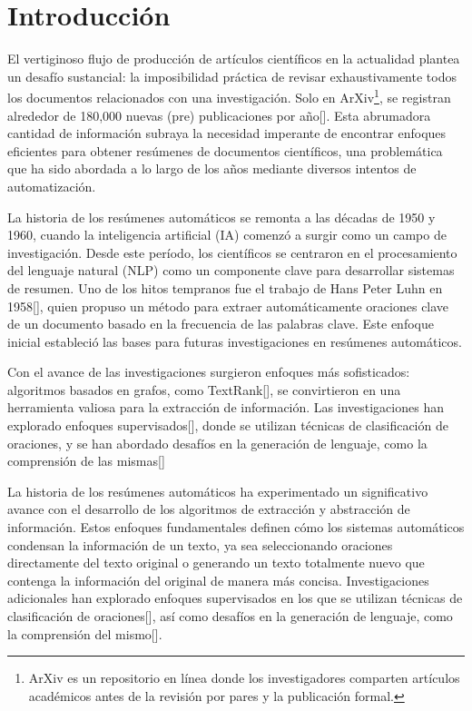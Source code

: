 \chapter*{Introducción}\label{chapter:introduction}

    El vertiginoso flujo de producción de artículos científicos en la actualidad plantea un desafío sustancial: la imposibilidad práctica de revisar exhaustivamente todos los documentos relacionados con una investigación. Solo en ArXiv\footnote{ArXiv es un repositorio en línea donde los investigadores comparten artículos académicos antes de la revisión por pares y la publicación formal.}, se registran alrededor de 180,000 nuevas (pre) publicaciones por año[\cite{arxivstats}]. Esta abrumadora cantidad de información subraya la necesidad imperante de encontrar enfoques eficientes para obtener resúmenes de documentos científicos, una problemática que ha sido abordada a lo largo de los años mediante diversos intentos de automatización.

    La historia de los resúmenes automáticos se remonta a las décadas de 1950 y 1960, cuando la inteligencia artificial (IA) comenzó a surgir como un campo de investigación. Desde este período, los científicos se centraron en el procesamiento del lenguaje natural (NLP) como un componente clave para desarrollar sistemas de resumen. Uno de los hitos tempranos fue el trabajo de Hans Peter Luhn en 1958[\cite{luhun1958}], quien propuso un método para extraer automáticamente oraciones clave de un documento basado en la frecuencia de las palabras clave. Este enfoque inicial estableció las bases para futuras investigaciones en resúmenes automáticos.

    Con el avance de las investigaciones surgieron enfoques más sofisticados: algoritmos basados en grafos, como TextRank[\cite{mihalcea2004textrank}], se convirtieron en una herramienta valiosa para la extracción de información. Las investigaciones han explorado enfoques supervisados[\cite{collins-etal-2017-supervised}], donde se utilizan técnicas de clasificación de oraciones, y se han abordado desafíos en la generación de lenguaje, como la comprensión de las mismas[\cite{knight2000statistics}]

    La historia de los resúmenes automáticos ha experimentado un significativo avance con el desarrollo de los algoritmos de extracción y abstracción de información. Estos enfoques fundamentales definen cómo los sistemas automáticos condensan la información de un texto, ya sea seleccionando oraciones directamente del texto original o generando un texto totalmente nuevo que contenga la información del original de manera más concisa. Investigaciones adicionales han explorado enfoques supervisados en los que se utilizan técnicas de clasificación de oraciones[\cite{collins-etal-2017-supervised}], así como desafíos en la generación de lenguaje, como la comprensión del mismo[\cite{knight2000statistics}].

